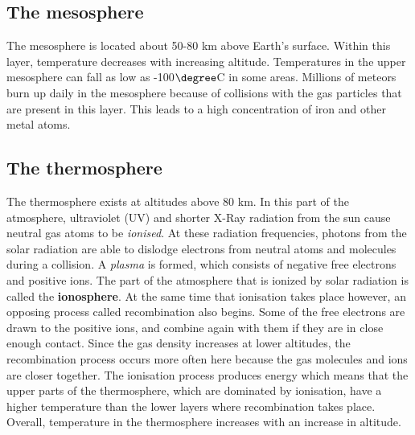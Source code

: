 \subsection{The mesosphere}

The mesosphere is located about 50-80 km above Earth's surface. Within this layer, temperature decreases with increasing altitude. Temperatures in the upper mesosphere can fall as low as -100$\degree$C in some areas. Millions of meteors burn up daily in the mesosphere because of collisions with the gas particles that are present in this layer. This leads to a high concentration of iron and other metal atoms. 

\subsection{The thermosphere}

The thermosphere exists at altitudes above 80 km. In this part of the atmosphere, ultraviolet (UV) and shorter X-Ray radiation from the sun cause neutral gas atoms to be \textit{ionised}. At these radiation frequencies, photons from the solar radiation are able to dislodge electrons from neutral atoms and molecules during a collision. A \textit{plasma} is formed, which consists of negative free electrons and positive ions. The part of the atmosphere that is ionized by solar radiation is called the \textbf{ionosphere}. At the same time that ionisation takes place however, an opposing process called recombination also begins. Some of the free electrons are drawn to the positive ions, and combine again with them if they are in close enough contact. Since the gas density increases at lower altitudes, the recombination process occurs more often here because the gas molecules and ions are closer together. The ionisation process produces energy which means that the upper parts of the thermosphere, which are dominated by ionisation, have a higher temperature than the lower layers where recombination takes place. Overall, temperature in the thermosphere increases with an increase in altitude.\\



